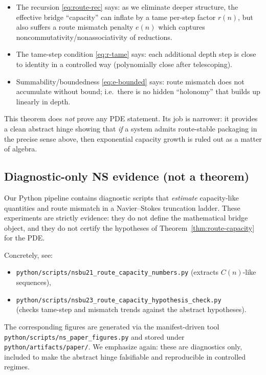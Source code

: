 \documentclass[11pt]{article}
\begin{document}
\begin{itemize}
\item The recursion \eqref{eq:route-rec} says: as we eliminate deeper structure, the effective bridge
``capacity'' can inflate by a tame per-step factor $r(n)$, but also suffers a route mismatch penalty
$e(n)$ which captures noncommutativity/nonassociativity of reductions.
\item The tame-step condition \eqref{eq:r-tame} says: each additional depth step is close to
identity in a controlled way (polynomially close after telescoping).
\item Summability/boundedness \eqref{eq:e-bounded} says: route mismatch does not accumulate without
bound; i.e.\ there is no hidden ``holonomy'' that builds up linearly in depth.
\end{itemize}

This theorem does \emph{not} prove any PDE statement. Its job is narrower: it provides a clean
abstract hinge showing that \emph{if} a system admits route-stable packaging in the precise sense
above, then exponential capacity growth is ruled out as a matter of algebra.

\subsection{Diagnostic-only NS evidence (not a theorem)}

Our Python pipeline contains diagnostic scripts that \emph{estimate} capacity-like quantities and
route mismatch in a Navier--Stokes truncation ladder. These experiments are strictly evidence:
they do not define the mathematical bridge object, and they do not certify the hypotheses of
Theorem~\ref{thm:route-capacity} for the PDE.

Concretely, see:
\begin{itemize}
\item \nolinkurl{python/scripts/nsbu21_route_capacity_numbers.py} (extracts $C(n)$-like sequences),
\item \nolinkurl{python/scripts/nsbu23_route_capacity_hypothesis_check.py}\\
(checks tame-step and mismatch trends against the abstract hypotheses).
\end{itemize}

The corresponding figures are generated via the manifest-driven tool
\nolinkurl{python/scripts/ns_paper_figures.py} and stored under
\nolinkurl{python/artifacts/paper/}. We emphasize again: these are diagnostics only, included to make
the abstract hinge falsifiable and reproducible in controlled regimes.
\end{document}

